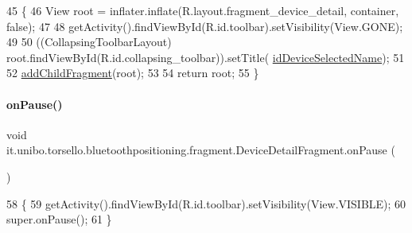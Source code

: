 \begin{DoxyCode}
45                                                                                                       \{
46         View root = inflater.inflate(R.layout.fragment\_device\_detail, container, \textcolor{keyword}{false});
47 
48         getActivity().findViewById(R.id.toolbar).setVisibility(View.GONE);
49 
50         ((CollapsingToolbarLayout) root.findViewById(R.id.collapsing\_toolbar)).setTitle(
      \hyperlink{classit_1_1unibo_1_1torsello_1_1bluetoothpositioning_1_1fragment_1_1DeviceDetailFragment_a6d52d8371a07fb8da75879758d1d6942_a6d52d8371a07fb8da75879758d1d6942}{idDeviceSelectedName});
51 
52         \hyperlink{classit_1_1unibo_1_1torsello_1_1bluetoothpositioning_1_1fragment_1_1DeviceDetailFragment_a62c541b8382a522f06a5d9c56cf50b26_a62c541b8382a522f06a5d9c56cf50b26}{addChildFragment}(root);
53 
54         \textcolor{keywordflow}{return} root;
55     \}
\end{DoxyCode}
\hypertarget{classit_1_1unibo_1_1torsello_1_1bluetoothpositioning_1_1fragment_1_1DeviceDetailFragment_a1ed4762356dd3067ce48aa73da50404e_a1ed4762356dd3067ce48aa73da50404e}{}\label{classit_1_1unibo_1_1torsello_1_1bluetoothpositioning_1_1fragment_1_1DeviceDetailFragment_a1ed4762356dd3067ce48aa73da50404e_a1ed4762356dd3067ce48aa73da50404e} 
\paragraph{\texorpdfstring{on\+Pause()}{onPause()}}
{\footnotesize\ttfamily void it.\+unibo.\+torsello.\+bluetoothpositioning.\+fragment.\+Device\+Detail\+Fragment.\+on\+Pause (\begin{DoxyParamCaption}{ }\end{DoxyParamCaption})}


\begin{DoxyCode}
58                           \{
59         getActivity().findViewById(R.id.toolbar).setVisibility(View.VISIBLE);
60         super.onPause();
61     \}
\end{DoxyCode}



